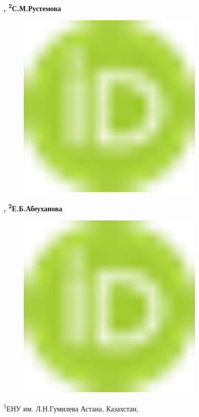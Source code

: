 {\bfseries ,
\textsuperscript{2}С.М.Рустемова}
\begin{figure}[H]
	\centering
	\includegraphics[width=0.8\textwidth]{media/ekon/image1}
	\caption*{}
\end{figure}
{\bfseries ,
\textsuperscript{2}Е.Б.Абеуханова}
\begin{figure}[H]
	\centering
	\includegraphics[width=0.8\textwidth]{media/ekon/image1}
	\caption*{}
\end{figure}


\textsuperscript{1}ЕНУ им. Л.Н.Гумилева Астана, Казахстан,

